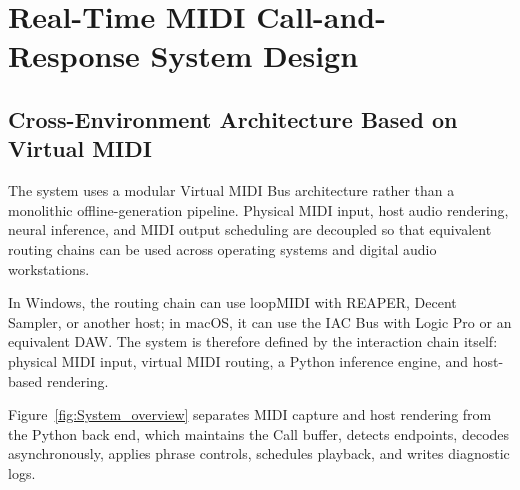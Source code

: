 \documentclass[11pt,a4paper]{article}
\begin{document}
\section{Real-Time MIDI Call-and-Response System Design}
\label{sec:system-design}

\subsection{Cross-Environment Architecture Based on Virtual MIDI }

The system uses a modular Virtual MIDI Bus architecture rather than a monolithic offline-generation pipeline. Physical MIDI input, host audio rendering, neural inference, and MIDI output scheduling are decoupled so that equivalent routing chains can be used across operating systems and digital audio workstations.

In Windows, the routing chain can use loopMIDI with REAPER, Decent Sampler, or another host; in macOS, it can use the IAC Bus with Logic Pro or an equivalent DAW. The system is therefore defined by the interaction chain itself: physical MIDI input, virtual MIDI routing, a Python inference engine, and host-based rendering.

Figure~\ref{fig:System_overview} separates MIDI capture and host rendering from the Python back end, which maintains the Call buffer, detects endpoints, decodes asynchronously, applies phrase controls, schedules playback, and writes diagnostic logs.
\end{document}
